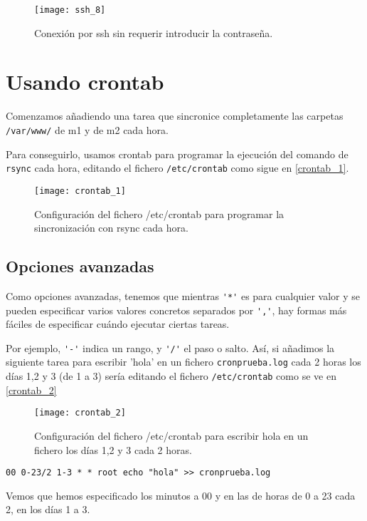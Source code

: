 \begin{figure}[h!]
\begin{center}
\caption{Conexión por ssh sin requerir introducir la contraseña.}
\label{ssh_8}
\texttt{[image: ssh\_8]}
\end{center}
\end{figure}

\chapter{Usando crontab}

Comenzamos añadiendo una tarea que sincronice completamente las carpetas \verb|/var/www/| de m1 y de m2 cada hora.

Para conseguirlo, usamos crontab para programar la ejecución del comando de \verb|rsync| cada hora, editando el fichero \verb|/etc/crontab| como sigue en \eqref{crontab_1}.

\begin{figure}[h!]
\begin{center}
\caption{Configuración del fichero /etc/crontab para programar la sincronización con rsync cada hora.}
\label{crontab_1}
\texttt{[image: crontab\_1]}
\end{center}
\end{figure}

\section{Opciones avanzadas}

Como opciones avanzadas, tenemos que mientras \verb|'*'| es para cualquier valor y se pueden especificar varios valores concretos separados por \verb|','|, hay formas más fáciles de especificar cuándo ejecutar ciertas tareas.

Por ejemplo, \verb|'-'| indica un rango, y \verb|'/'| el paso o salto. Así, si añadimos la siguiente tarea para escribir 'hola' en un fichero \verb|cronprueba.log| cada 2 horas los días 1,2 y 3 (de 1 a 3) sería editando el fichero \verb|/etc/crontab| como se ve en \eqref{crontab_2}

\begin{figure}[h!]
\begin{center}
\caption{Configuración del fichero /etc/crontab para escribir hola en un fichero los días 1,2 y 3 cada 2 horas.}
\label{crontab_2}
\texttt{[image: crontab\_2]}
\end{center}
\end{figure}

\begin{verbatim}
00 0-23/2 1-3 * * root echo "hola" >> cronprueba.log
\end{verbatim}

Vemos que hemos especificado los minutos a 00 y en las de horas de 0 a 23 cada 2, en los días 1 a 3.










